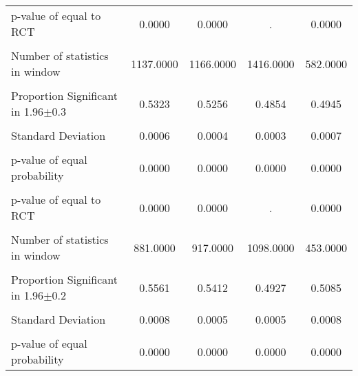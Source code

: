 {\begin{tabular}{l*{4}{c}}
p-value of equal to RCT&   0.0000         &   0.0000         &        .         &   0.0000         \\
                &                  &                  &                  &                  \\
Number of statistics in window&1137.0000         &1166.0000         &1416.0000         & 582.0000         \\
                &                  &                  &                  &                  \\
\hline Proportion Significant in 1.96$\pm$0.3&   0.5323         &   0.5256         &   0.4854         &   0.4945         \\
                &                  &                  &                  &                  \\
Standard Deviation&   0.0006         &   0.0004         &   0.0003         &   0.0007         \\
                &                  &                  &                  &                  \\
p-value of equal probability&   0.0000         &   0.0000         &   0.0000         &   0.0000         \\
                &                  &                  &                  &                  \\
p-value of equal to RCT&   0.0000         &   0.0000         &        .         &   0.0000         \\
                &                  &                  &                  &                  \\
Number of statistics in window& 881.0000         & 917.0000         &1098.0000         & 453.0000         \\
                &                  &                  &                  &                  \\
\hline Proportion Significant in 1.96$\pm$0.2&   0.5561         &   0.5412         &   0.4927         &   0.5085         \\
                &                  &                  &                  &                  \\
Standard Deviation&   0.0008         &   0.0005         &   0.0005         &   0.0008         \\
                &                  &                  &                  &                  \\
p-value of equal probability&   0.0000         &   0.0000         &   0.0000         &   0.0000         \\

\end{tabular}}

